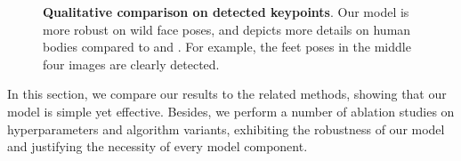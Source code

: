 \documentclass{article}
\begin{document}
\begin{figure}[t]
\centering
  \caption{\textbf{Qualitative comparison on detected keypoints}. Our model is more robust on wild face poses, and depicts more details on human bodies compared to \cite{he2021latentkeypointgan} and \cite{he2022ganseg}. For example, the feet poses in the middle four images are clearly detected.}
\label{fig:qualitative}
\end{figure}

In this section, we compare our results to the related methods, showing that our model is simple yet effective. Besides, we perform a number of ablation studies on hyperparameters and algorithm variants, exhibiting the robustness of our model and justifying the necessity of every model component.
\end{document}
